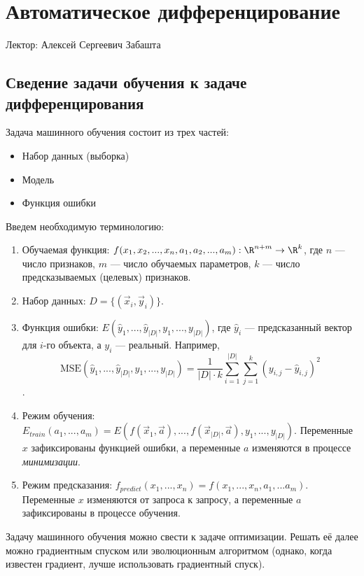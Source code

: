 \chapter{Автоматическое дифференцирование}

Лектор: Алексей Сергеевич Забашта

\section{Сведение задачи обучения к задаче дифференцирования}

Задача машинного обучения состоит из трех частей:
\begin{itemize}
    \item Набор данных (выборка)
    \item Модель
    \item Функция ошибки
\end{itemize}

Введем необходимую терминологию:
\begin{enumerate}
    \item Обучаемая функция: $f(x_1, x_2, ..., x_n, a_1, a_2, ..., a_m): \R ^{n + m}\to\R ^k$, где $n$ --- число признаков, $m$ --- число обучаемых параметров, $k$ --- число предсказываемых (целевых) признаков.
    \item Набор данных: $D=\{(\vec{x}_i, \vec{y}_i)\}$.
    \item Функция ошибки: $E(\widehat{y}_1, ..., \widehat{y}_{|D|}, y_1, ..., y_{|D|})$, где $\widehat{y}_i$ --- предсказанный вектор для $i$-го объекта, а $y_i$ --- реальный. Например, $$\mathrm{MSE}(\widehat{y}_1, ..., \widehat{y}_{|D|}, y_1, ..., y_{|D|})=\frac{1}{|D|\cdot k}\sum_{i=1}^{|D|}\sum_{j=1}^k(y_{i,j} - \widehat{y}_{i,j})^2$$.
    \item Режим обучения: $E_{train}(a_1,...,a_m)=E(f(\vec{x}_1, \vec{a}),...,f(\vec{x}_{|D|}, \vec{a}),y_1,...,y_{|D|})$. Переменные $x$ зафиксированы функцией ошибки, а переменные $a$ изменяются в процессе \textit{минимизации}.
    \item Режим предсказания: $f_{predict}(x_1,...,x_n)=f(x_1,...,x_n,a_1,...a_m)$. Переменные $x$ изменяются от запроса к запросу, а переменные $a$ зафиксированы в процессе обучения.
\end{enumerate}

Задачу машинного обучения можно свести к задаче оптимизации. Решать её далее можно градиентным спуском или эволюционным алгоритмом (однако, когда известен градиент, лучше использовать градиентный спуск).

